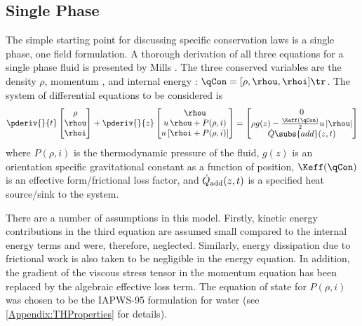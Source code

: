 \subsection{Single Phase}
The simple starting point for discussing specific conservation laws is a single phase, one field formulation.
A thorough derivation of all three equations for a single phase fluid is presented by Mills \cite[pg. 451]{mills_heat_1994}.
The three conserved variables are the density $\rho$, momentum \rhou, and internal energy \rhoi:  $\qCon = [\rho,\rhou,\rhoi]\tr$.
The system of differential equations to be considered is
\begin{equation}
    \pderiv{}{t}\begin{bmatrix}
                   \rho \\
                   \rhou \\
                   \rhoi 
                \end{bmatrix}
    + 
    \pderiv{}{z}\begin{bmatrix}
                    \rhou                 \\
                    u\,\rhou + P(\rho,i)   \\
                    u\left[\rhoi  + P(\rho,i)\right]
                \end{bmatrix}
             =  
    \begin{bmatrix}
        0 \\%
        \rho{g(z)} - \frac{\Keff(\qCon)}{2} u\,|\rhou|  \\
        \dot{Q}\subs{add}(z,t)
    \end{bmatrix}
    \label{Eqn:HEMBasic}
\end{equation}
where $P(\rho,i)$ is the thermodynamic pressure of the fluid, $g(z)$ is an orientation specific gravitational constant as a function of position, $\Keff(\qCon)$ is an effective form/frictional loss factor, and $\dot{Q}_{\mbox{\scriptsize{add}}}(z,t)$ is a specified heat source/sink to the system.

There are a number of assumptions in this model.  
Firstly, kinetic energy contributions in the third equation are assumed small compared to the internal energy terms and were, therefore, neglected.
Similarly, energy dissipation due to frictional work is also taken to be negligible in the energy equation.
In addition, the gradient of the viscous stress tensor in the momentum equation has been replaced by the algebraic effective loss term.  The equation of state for $P(\rho,i)$ was chosen to be the IAPWS-95 formulation for water (see \cref{Appendix:THProperties} for details).

